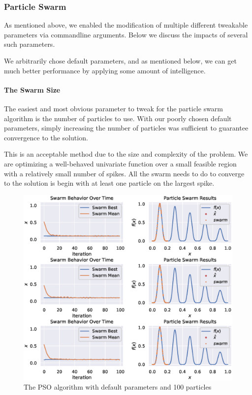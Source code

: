 \documentclass[12pt]{article}
\begin{document}
\subsubsection{Particle Swarm}
As mentioned above, we enabled the modification of multiple different tweakable parameters via commandline arguments.
Below we discuss the impacts of several such parameters.

We arbitrarily chose default parameters, and as mentioned below, we can get much better performance by applying some amount of intelligence.

\paragraph{The Swarm Size} The easiest and most obvious parameter to tweak for the particle swarm algorithm is the number of particles to use.
With our poorly chosen default parameters, simply increasing the number of particles was sufficient to guarantee convergence to the solution.

This is an acceptable method due to the size and complexity of the problem.
We are optimizing a well-behaved univariate function over a small feasible region with a relatively small number of spikes.
All the swarm needs to do to converge to the solution is begin with at least one particle on the largest spike.

\begin{figure}[H]
    \centering
    \includegraphics[width=\textwidth]{figures/pso/pso-100-particles.eps}
    \caption{The PSO algorithm with default parameters and 100 particles}\label{fig:pso:100-particles}
\end{figure}
\end{document}

